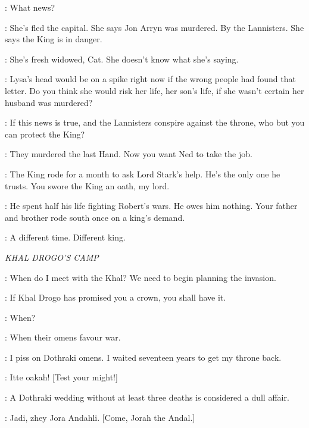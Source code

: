 \NED: What news? 

\CATELYN: She's fled the capital. She says Jon Arryn was murdered. By the Lannisters. She says the King is in danger. 

\NED: She's fresh widowed, Cat. She doesn't know what she's saying. 

\CATELYN: Lysa's head would be on a spike right now if the wrong people had found that letter. Do you think she would risk her life, her son's life, if she wasn't certain her husband was murdered? 

\LUWIN: If this news is true, and the Lannisters conspire against the throne, who but you can protect the King? 

\CATELYN: They murdered the last Hand. Now you want Ned to take the job. 

\LUWIN: The King rode for a month to ask Lord Stark's help. He's the only one he trusts. You swore the King an oath, my lord. 

\CATELYN: He spent half his life fighting Robert's wars. He owes him nothing.  Your father and brother rode south once on a king's demand. 

\LUWIN: A different time. Different king. 


\scene

\textit{KHAL DROGO'S CAMP} 


\VISERYS: When do I meet with the Khal? We need to begin planning the invasion. 

\ILLYRIO: If Khal Drogo has promised you a crown, you shall have it. 

\VISERYS: When? 

\ILLYRIO: When their omens favour war. 

\VISERYS: I piss on Dothraki omens. I waited seventeen years to get my throne back. 

\DROGO: Itte oakah! [Test your might!]


\ILLYRIO: A Dothraki wedding without at least three deaths is considered a dull affair. 


\DROGO: Jadi, zhey Jora Andahli. [Come, Jorah the Andal.]

